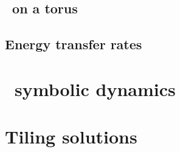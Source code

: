 \subsection{\KS\ on a torus}
\label{sect:KStwots}


\subsection{Energy transfer rates}
\label{sect:KSenerg}


\section{\Spt\ symbolic dynamics}
\label{sect:SpatTempSymbDyn}




  \section{Tiling {\spt} solutions}
   \label{sect:tiles}


\printbibliography[heading=subbibintoc,title={References}]
